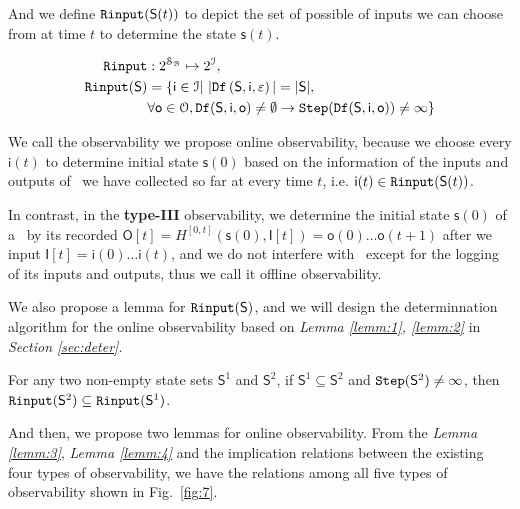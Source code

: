 And we define ${\tt Rinput}(\mathsf{S}(t))$ to depict the set of possible of inputs we can choose from at time $t$ to determine the state $\mathsf{s}(t)$.

\begin{equation}
\begin{split}
{\tt Rinput}&:2^{\mathcal{S}_{\mathcal{B}}} \mapsto2^{\mathcal{I}},\\
{\tt Rinput}(\mathsf{S})&=\{\mathsf{i}\in \mathcal{I}|\  |{\tt Df}\left(\mathsf{S},\mathsf{i},\varepsilon\right)|=|\mathsf{S}|, \\
&\forall \mathsf{o} \in \mathcal{O}, {\tt Df}(\mathsf{S},\mathsf{i},\mathsf{o})\ne \emptyset \rightarrow {\tt Step}({\tt Df}(\mathsf{S},\mathsf{i},\mathsf{o}))\ne \infty\}
\end{split}
\end{equation}

We call the observability we propose online observability, because we choose every $\mathsf{i}(t)$ to determine initial state $\mathsf{s}(0)$ based on the information of the inputs and outputs of \BCN\ we have collected so far at every time $t$, i.e. $\mathsf{i}(t)\in{\tt Rinput}(\mathsf{S}(t))$. 

In contrast, in the {\bf type-III} observability, we determine the initial state $\mathsf{s}(0)$ of a \BCN\ by its recorded $\mathsf{O}[t]= H^{[0,t]}(\mathsf{s}(0),\mathsf{I}[t])=\mathsf{o}(0)\ldots\mathsf{o}(t+1)$ after we input $\mathsf{I}[t]=\mathsf{i}(0)\ldots\mathsf{i}(t)$, and  we do not interfere with \BCN\ except for the logging of its inputs and outputs, thus we call it offline observability.

We also propose a lemma for ${\tt Rinput}(\mathsf{S})$, and we will design the determinnation algorithm for the online observability based on {\em Lemma \ref{lemm:1}, \ref{lemm:2}} in {\em Section \ref{sec:deter}}.
\begin{lemma}
For any two non-empty state sets  $\mathsf{S}^{1}$ and $\mathsf{S}^{2}$, if $\mathsf{S}^{1}\subseteq\mathsf{S}^{2}$ and ${\tt Step}(\mathsf{S}^{2})\ne\infty$, then ${\tt Rinput}(\mathsf{S}^2)\subseteq{\tt Rinput}(\mathsf{S}^1)$.
\label{lemm:2}
\end{lemma}





And then, we propose two lemmas for online observability. From the {\em Lemma \ref{lemm:3}}, {\em Lemma \ref{lemm:4}} and the implication relations between the existing four types of observability, we have the relations among all five types of observability shown in Fig.~\ref{fig:7}.


